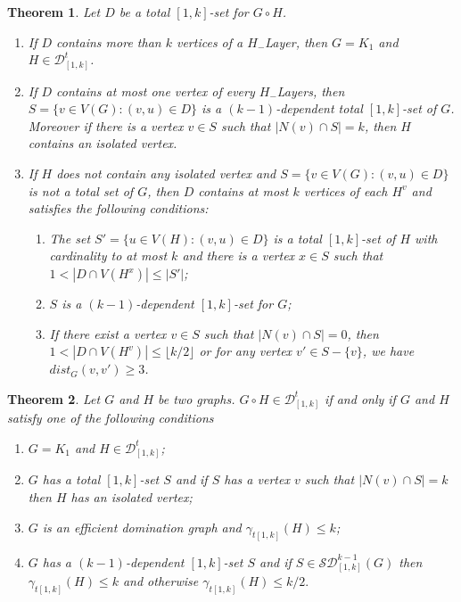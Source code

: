 \documentclass[A4,12pt]{article}
\newtheorem{theorem}{Theorem}[section]
\theoremstyle{definition}
\theoremstyle{remark}
\begin{document}
\begin{theorem}\label{Lexk}
Let $D$ be a total $[1,k]$-set for $G \circ H$.
\begin{enumerate}
  \item [a)]
  If $D$ contains more than $k$ vertices of a $H_{-}$Layer, then $G=K_1$ and $H \in \mathcal{D}^t_{[1,k]}$.

 \item [b)]
 If $D$ contains at most one vertex of every $H_{-}$Layers, then $S=\{v\in V(G):(v,u)\in D\}$ is a $(k-1)$-dependent total $[1,k]$-set of $G$. Moreover if there is a vertex $v \in S$ such that $\vert N(v) \cap S\vert =k$, then $H$ contains an isolated vertex.

 \item [c)]
If $H$ does not contain any isolated vertex and  $S=\{v\in V(G):(v,u)\in D\}$ is not a total set of $G$, then $D$ contains at most $k$ vertices of each $H^v$ and  satisfies the following conditions:

\begin{enumerate}
  \item [c1)]
  The set $S'=\{u\in V(H):(v,u)\in D\}$ is a  total $[1,k]$-set  of $H$ with cardinality to at most $k$  and there is a vertex $x\in S$  such that $1<|D\cap V(H^x)|\leq |S'|$;

\item [c2)]
$S$ is a $(k-1)$-dependent $[1,k]$-set for $G$;
\item [c3)]
 If there exist a vertex  $v\in S$ such that $\vert  N(v)\cap S\vert  =0$, then  $1<|D\cap V(H^v)|\leq \lfloor k/ 2 \rfloor$ or  for any vertex $v' \in S-\{v\}$, we have $dist_G(v,v')\geq 3$.
 \end{enumerate}
 \end{enumerate}

 \end{theorem}


\begin{theorem}
	Let $G$ and $H$ be two graphs. $G\circ H \in \mathcal{D}^t_{[1,k]}$ if and only if $G$ and $H$ satisfy one of the following conditions

\begin{enumerate}
\item
$G=K_1$ and $H \in \mathcal{D}^t_{[1,k]}$;
  \item
  $G$ has a total $[1,k]$-set $S$ and if $S$ has a vertex $v$ such that $\vert N(v) \cap S\vert =k$ then $H$ has an isolated vertex;
  \item
  $G$ is an efficient domination graph  and $\gamma_{t[1,k]}(H)\leq k$;
  \item
   $G$ has a $(k-1)$-dependent $[1,k]$-set $S$ and if $S \in \mathcal{SD}^{k-1}_{[1,k]}(G)$ then $\gamma_{t[1,k]}(H)\leq k$ and otherwise $\gamma_{t[1,k]}(H)\leq k/2.$

\end{enumerate}
\end{theorem}
\end{document}
